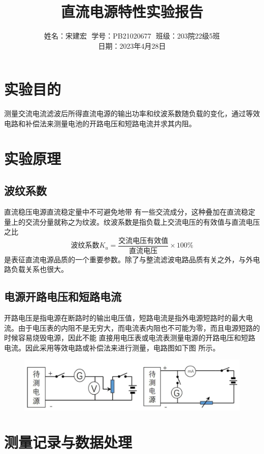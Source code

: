 \documentclass{article}
\title{直流电源特性实验报告}
\author{姓名：宋建宏\,\, 学号：PB21020677\,\, 班级：203院22级5班\\ 日期：2023年4月28日}
\date{}
\begin{document}
\maketitle
\section*{实验目的}
测量交流电流滤波后所得直流电源的输出功率和纹波系数随负载的变化，通过等效电路和补偿法来测量电池的开路电压和短路电流并求其内阻。

\section*{实验原理}


\subsection*{波纹系数}
直流稳压电源直流稳定量中不可避免地带
有一些交流成分，这种叠加在直流稳定量上的交流分量就称之为纹波。纹波系数是指负载上交流电压的有效值与直流电压之比
\begin{equation*}
    \text{波纹系数}K_u=\frac{\text{交流电压有效值}}{\text{直流电压}}\times 100\%
\end{equation*}
是表征直流电源品质的一个重要参数。除了与整流滤波电路品质有关之外，与外电路负载关系也很大。

\subsection*{电源开路电压和短路电流}
开路电压是指电源在断路时的输出电压值，短路电流是指外电源短路时的最大电
流。由于电压表的内阻不是无穷大，而电流表内阻也不可能为零，而且电源短路的时候容易烧毁电源，因此不能
直接用电压表或电流表测量电源的开路电压和短路电流。因此采用等效电路或补偿法来进行测量，电路图如下图
所示。

\begin{figure}[htbp]
    \centering
    \includegraphics*[scale=1]{dl.png}
\end{figure}

\section*{测量记录与数据处理}
\end{document}
